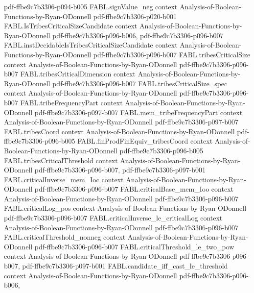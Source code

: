 \begin{theorem}
  {pdf-ffbe9c7b3306-p094-b005}
\proofstep
  {FABL.signValue_neg}
  {context}
  {Analysis-of-Boolean-Functions-by-Ryan-ODonnell}
  {pdf-ffbe9c7b3306-p020-b001}
\proofstep
  {FABL.IsTribesCriticalSizeCandidate}
  {context}
  {Analysis-of-Boolean-Functions-by-Ryan-ODonnell}
  {pdf-ffbe9c7b3306-p096-b006,
    pdf-ffbe9c7b3306-p096-b007}
\proofstep
  {FABL.instDecidableIsTribesCriticalSizeCandidate}
  {context}
  {Analysis-of-Boolean-Functions-by-Ryan-ODonnell}
  {pdf-ffbe9c7b3306-p096-b007}
\proofstep
  {FABL.tribesCriticalSize}
  {context}
  {Analysis-of-Boolean-Functions-by-Ryan-ODonnell}
  {pdf-ffbe9c7b3306-p096-b007}
\proofstep
  {FABL.tribesCriticalDimension}
  {context}
  {Analysis-of-Boolean-Functions-by-Ryan-ODonnell}
  {pdf-ffbe9c7b3306-p096-b007}
\proofstep
  {FABL.tribesCriticalSize_spec}
  {context}
  {Analysis-of-Boolean-Functions-by-Ryan-ODonnell}
  {pdf-ffbe9c7b3306-p096-b007}
\proofstep
  {FABL.tribeFrequencyPart}
  {context}
  {Analysis-of-Boolean-Functions-by-Ryan-ODonnell}
  {pdf-ffbe9c7b3306-p097-b007}
\proofstep
  {FABL.mem_tribeFrequencyPart}
  {context}
  {Analysis-of-Boolean-Functions-by-Ryan-ODonnell}
  {pdf-ffbe9c7b3306-p097-b007}
\proofstep
  {FABL.tribesCoord}
  {context}
  {Analysis-of-Boolean-Functions-by-Ryan-ODonnell}
  {pdf-ffbe9c7b3306-p096-b005}
\proofstep
  {FABL.finProdFinEquiv_tribesCoord}
  {context}
  {Analysis-of-Boolean-Functions-by-Ryan-ODonnell}
  {pdf-ffbe9c7b3306-p096-b005}
\proofstep
  {FABL.tribesCriticalThreshold}
  {context}
  {Analysis-of-Boolean-Functions-by-Ryan-ODonnell}
  {pdf-ffbe9c7b3306-p096-b007,
    pdf-ffbe9c7b3306-p097-b001}
\proofstep
  {FABL.criticalInverse_mem_Ioc}
  {context}
  {Analysis-of-Boolean-Functions-by-Ryan-ODonnell}
  {pdf-ffbe9c7b3306-p096-b007}
\proofstep
  {FABL.criticalBase_mem_Ioo}
  {context}
  {Analysis-of-Boolean-Functions-by-Ryan-ODonnell}
  {pdf-ffbe9c7b3306-p096-b007}
\proofstep
  {FABL.criticalLog_pos}
  {context}
  {Analysis-of-Boolean-Functions-by-Ryan-ODonnell}
  {pdf-ffbe9c7b3306-p096-b007}
\proofstep
  {FABL.criticalInverse_le_criticalLog}
  {context}
  {Analysis-of-Boolean-Functions-by-Ryan-ODonnell}
  {pdf-ffbe9c7b3306-p096-b007}
\proofstep
  {FABL.criticalThreshold_nonneg}
  {context}
  {Analysis-of-Boolean-Functions-by-Ryan-ODonnell}
  {pdf-ffbe9c7b3306-p096-b007}
\proofstep
  {FABL.criticalThreshold_le_two_pow}
  {context}
  {Analysis-of-Boolean-Functions-by-Ryan-ODonnell}
  {pdf-ffbe9c7b3306-p096-b007,
    pdf-ffbe9c7b3306-p097-b001}
\proofstep
  {FABL.candidate_iff_cast_le_threshold}
  {context}
  {Analysis-of-Boolean-Functions-by-Ryan-ODonnell}
  {pdf-ffbe9c7b3306-p096-b006,
}
\end{theorem}
